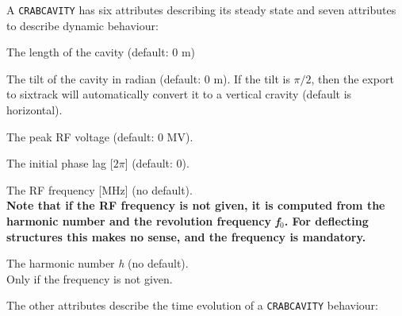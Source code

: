 
A \texttt{CRABCAVITY} has six attributes describing its steady state
and seven attributes to describe dynamic behaviour:

\begin{madlist}
   The length of the cavity (default: 0 m)

   The tilt of the cavity in radian (default: 0 m). If the tilt is $\pi/2$, then the export to sixtrack will automatically convert it to a vertical cravity (default is horizontal).

   The peak RF voltage (default: 0 MV).

   The initial phase lag [$2\pi$] (default: 0).

   The RF frequency [MHz] (no default). \\[3mm]
    \textbf{Note that if the RF frequency is not given, it is computed from the
    harmonic number and the revolution frequency \textit{f$_0$}.
    For deflecting structures this makes no sense, and the
    frequency is mandatory.}

   The harmonic number \textit{h} (no default). \\
  Only if the frequency is not given.

\end{madlist}

The other attributes describe the time evolution of a \texttt{CRABCAVITY} behaviour:

